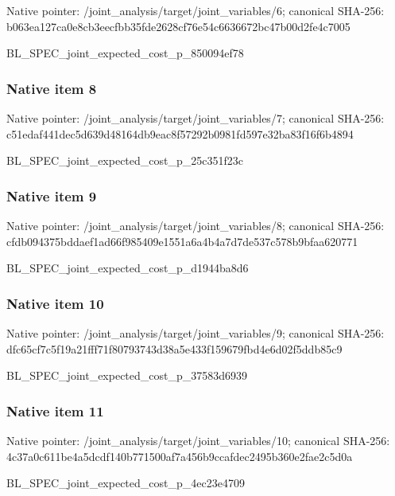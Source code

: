 \documentclass[10pt,a4paper]{article}
\begin{document}
Native pointer: /joint\_analysis/target/j\allowbreak{}oint\_variables/6; canonical SHA-256: b063ea127ca0e8cb3eecfbb3\allowbreak{}5fde2628cf76e54c6636672b\allowbreak{}c47b00d2fe4c7005


BL\_SPEC\_joint\_expected\_c\allowbreak{}ost\_p\_850094ef78


\subsubsection{Native item 8}


Native pointer: /joint\_analysis/target/j\allowbreak{}oint\_variables/7; canonical SHA-256: c51edaf441dec5d639d48164\allowbreak{}db9eac8f57292b0981fd597e\allowbreak{}32ba83f16f6b4894


BL\_SPEC\_joint\_expected\_c\allowbreak{}ost\_p\_25c351f23c


\subsubsection{Native item 9}


Native pointer: /joint\_analysis/target/j\allowbreak{}oint\_variables/8; canonical SHA-256: cfdb094375bddaef1ad66f98\allowbreak{}5409e1551a6a4b4a7d7de537\allowbreak{}c578b9bfaa620771


BL\_SPEC\_joint\_expected\_c\allowbreak{}ost\_p\_d1944ba8d6


\subsubsection{Native item 10}


Native pointer: /joint\_analysis/target/j\allowbreak{}oint\_variables/9; canonical SHA-256: dfc65cf7c5f19a21fff71f80\allowbreak{}793743d38a5e433f159679fb\allowbreak{}d4e6d02f5ddb85c9


BL\_SPEC\_joint\_expected\_c\allowbreak{}ost\_p\_37583d6939


\subsubsection{Native item 11}


Native pointer: /joint\_analysis/target/j\allowbreak{}oint\_variables/10; canonical SHA-256: 4c37a0c611be4a5dcdf140b7\allowbreak{}71500af7a456b9ccafdec249\allowbreak{}5b360e2fae2c5d0a


BL\_SPEC\_joint\_expected\_c\allowbreak{}ost\_p\_4ec23e4709
\end{document}
